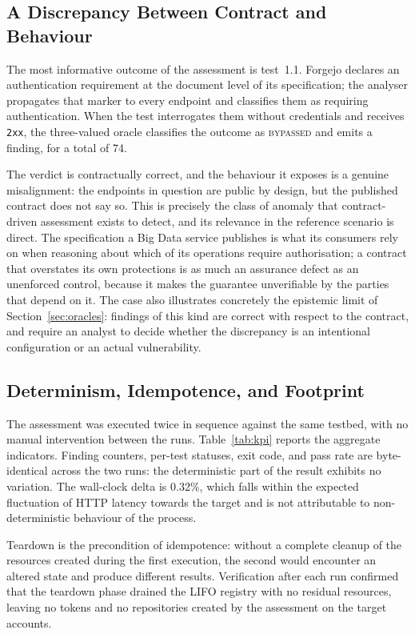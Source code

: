 \documentclass[
]{ceurart}
\begin{document}
\subsection{A Discrepancy Between Contract and Behaviour}
\label{sec:discrepancy}

The most informative outcome of the assessment is test~1.1.
Forgejo declares an authentication requirement at the document level of its specification; the analyser propagates that marker to every endpoint and classifies them as requiring authentication.
When the test interrogates them without credentials and receives \texttt{2xx}, the three-valued oracle classifies the outcome as \textsc{bypassed} and emits a finding, for a total of 74.

The verdict is contractually correct, and the behaviour it exposes is a genuine misalignment: the endpoints in question are public by design, but the published contract does not say so.
This is precisely the class of anomaly that contract-driven assessment exists to detect, and its relevance in the reference scenario is direct.
The specification a Big Data service publishes is what its consumers rely on when reasoning about which of its operations require authorisation; a contract that overstates its own protections is as much an assurance defect as an unenforced control, because it makes the guarantee unverifiable by the parties that depend on it.
The case also illustrates concretely the epistemic limit of Section~\ref{sec:oracles}: findings of this kind are correct with respect to the contract, and require an analyst to decide whether the discrepancy is an intentional configuration or an actual vulnerability.

\subsection{Determinism, Idempotence, and Footprint}

The assessment was executed twice in sequence against the same testbed, with no manual intervention between the runs.
Table~\ref{tab:kpi} reports the aggregate indicators.
Finding counters, per-test statuses, exit code, and pass rate are byte-identical across the two runs: the deterministic part of the result exhibits no variation.
The wall-clock delta is 0.32\%, which falls within the expected fluctuation of HTTP latency towards the target and is not attributable to non-deterministic behaviour of the process.

Teardown is the precondition of idempotence: without a complete cleanup of the resources created during the first execution, the second would encounter an altered state and produce different results.
Verification after each run confirmed that the teardown phase drained the LIFO registry with no residual resources, leaving no tokens and no repositories created by the assessment on the target accounts.
\end{document}

